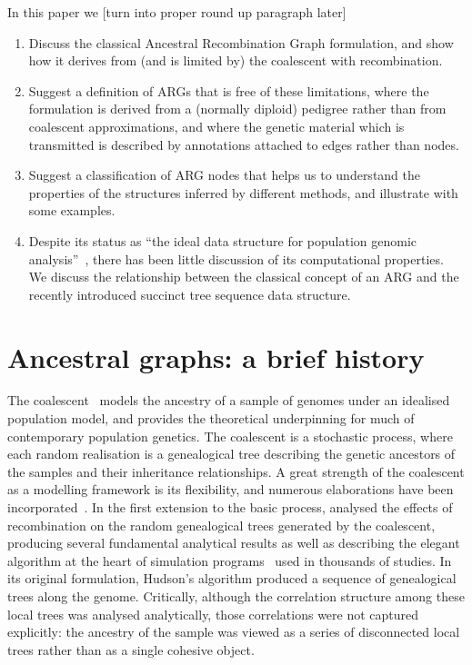 \documentclass{article}
\begin{document}
In this paper we [turn into proper round up paragraph later]
\begin{enumerate}
\item Discuss the classical Ancestral Recombination Graph formulation,
and show how it derives from (and is limited by) the coalescent with
recombination.
\item Suggest a definition of ARGs that is free of these limitations,
where the formulation is derived from a (normally diploid) pedigree rather than from
coalescent approximations, and where the genetic
material which is transmitted is described by annotations attached to
edges rather than nodes.
\item Suggest a classification of ARG nodes that helps us to understand
the properties of the structures inferred by different methods, and illustrate
with some examples.
\item Despite its status as ``the ideal data structure for
population genomic analysis''~\citep{rasmussen2014genome}, there has been
little discussion of its computational properties. We discuss the
relationship between the classical concept of an ARG and the
recently introduced succinct tree sequence data structure.
\end{enumerate}

\section*{Ancestral graphs: a brief history}
The coalescent~\citep{kingman1982coalescent,kingman1982genealogy,
hudson1983testing, tajima1983evolutionary} models the ancestry of a sample of
genomes under an idealised population model, and provides the theoretical
underpinning for much of contemporary population genetics.
The coalescent is a stochastic process, where each random realisation
is a genealogical tree describing the genetic
ancestors of the samples and their inheritance relationships.
A great strength of the coalescent as a modelling framework
is its flexibility, and numerous elaborations have been
incorporated~\citep{hudson1990gene,hein2004gene,wakely2008coalescent}.
In the first extension to the basic process, \cite{hudson1983properties}
analysed the effects of recombination on the random genealogical
trees generated by the coalescent,
producing several fundamental analytical results
as well as describing the elegant algorithm
at the heart of simulation
programs~\citep{hudson2002generating,kelleher2016efficient,baumdicker2021efficient}
used in thousands of studies.
In its original formulation, Hudson's algorithm produced a
sequence of genealogical trees along the genome.
Critically, although the correlation structure among these
local trees was analysed analytically, those correlations
were not captured explicitly: the ancestry of the sample
was viewed as a series of disconnected local trees rather than
as a single cohesive object.
\end{document}
